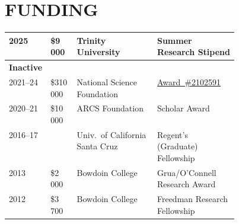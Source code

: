 \section{FUNDING}
\begin{tabular}{@{}p{.1\linewidth} p{0.1\linewidth} p{0.35\linewidth} @{}p{.4\linewidth}} 
    2025 & \$9\,000 & Trinity University & Summer Research Stipend\\
    \midrule
    \textbf{Inactive}\\
    2021--24 & \$310\,000 & National Science Foundation & \href{https://www.nsf.gov/awardsearch/showAward?AWD_ID=2102591}{Award~\#2102591}\\
    2020--21 & \$10\,000 & ARCS Foundation & Scholar Award \\
    2016--17 &  & Univ.~of California Santa Cruz  & Regent's (Graduate) Fellowship \\
    2013 & \$2\,000 & Bowdoin College & Grua/O'Connell Research Award  \\ 
    2012 & \$3\,700 & Bowdoin College & Freedman Research Fellowship \\
\end{tabular}